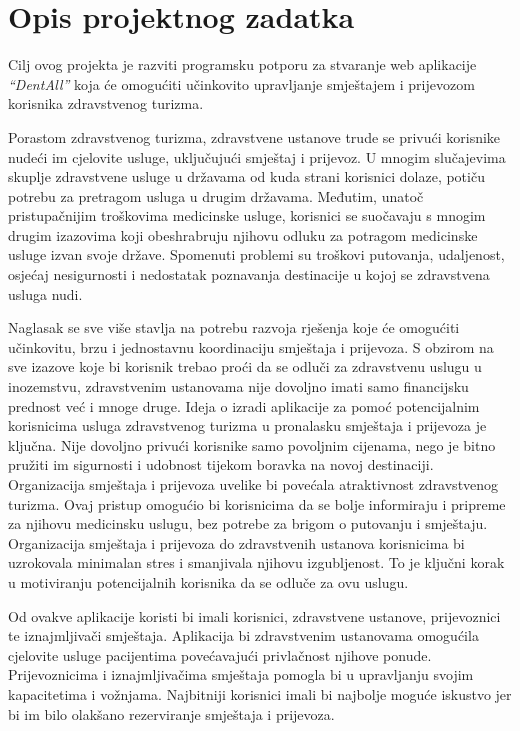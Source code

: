 \chapter{Opis projektnog zadatka}
		
		Cilj ovog projekta je razviti programsku potporu za stvaranje web aplikacije \textit{ “DentAll”} koja će omogućiti učinkovito upravljanje smještajem i prijevozom korisnika zdravstvenog turizma.
		
		Porastom zdravstvenog turizma, zdravstvene ustanove trude se privući korisnike nudeći im cjelovite usluge, uključujući smještaj i prijevoz.  U mnogim slučajevima skuplje zdravstvene usluge u državama od kuda strani korisnici dolaze, potiču potrebu za pretragom usluga u drugim državama. Međutim, unatoč pristupačnijim troškovima medicinske usluge, korisnici se suočavaju s mnogim drugim izazovima koji obeshrabruju njihovu odluku za potragom medicinske usluge izvan svoje države. Spomenuti problemi su troškovi putovanja, udaljenost, osjećaj nesigurnosti i nedostatak poznavanja destinacije u kojoj se zdravstvena usluga nudi.
		
		Naglasak se sve više stavlja na potrebu razvoja rješenja koje će omogućiti učinkovitu, brzu i jednostavnu koordinaciju smještaja i prijevoza. S obzirom na sve izazove koje bi korisnik trebao proći da se odluči za zdravstvenu uslugu u inozemstvu, zdravstvenim ustanovama nije dovoljno imati samo financijsku prednost već i mnoge druge. Ideja o izradi aplikacije za pomoć potencijalnim korisnicima usluga zdravstvenog turizma u pronalasku smještaja i prijevoza je ključna. Nije dovoljno privući korisnike samo povoljnim cijenama, nego je bitno pružiti im sigurnosti i udobnost tijekom boravka na novoj destinaciji. Organizacija smještaja i prijevoza uvelike bi povećala atraktivnost zdravstvenog turizma. Ovaj pristup omogućio bi korisnicima da se bolje informiraju i pripreme za njihovu medicinsku uslugu, bez potrebe za brigom o putovanju i smještaju. Organizacija smještaja i prijevoza do zdravstvenih ustanova korisnicima bi uzrokovala minimalan stres i smanjivala njihovu izgubljenost. To je ključni korak u motiviranju potencijalnih korisnika da se odluče za ovu uslugu.  
		
		Od ovakve aplikacije koristi bi imali korisnici, zdravstvene ustanove, prijevoznici te iznajmljivači smještaja. Aplikacija bi zdravstvenim ustanovama omogućila cjelovite usluge pacijentima povećavajući privlačnost njihove ponude. Prijevoznicima i iznajmljivačima smještaja pomogla bi u upravljanju svojim kapacitetima i vožnjama. Najbitniji korisnici imali bi najbolje moguće iskustvo jer bi im bilo olakšano rezerviranje smještaja i prijevoza.
		
